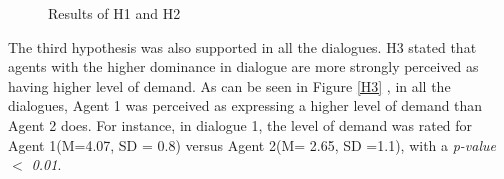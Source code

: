 \documentclass{llncs}
\begin{document}
							\begin{figure}[htb!]
					\setlength\fboxsep{0pt}\setlength\fboxrule{0.75pt}
					{
						\caption{Results of H1 and H2}
						
					}
				\end{figure}%
				
				\par The third hypothesis was also supported in all the dialogues. H3 stated that agents with the higher dominance in dialogue are more strongly perceived as having higher level of demand. As can be seen in Figure \ref{H3} , in all the dialogues, Agent 1 was perceived as expressing a higher level of demand than Agent 2 does. For instance, in dialogue 1, the level of demand was rated for Agent 1(M=4.07, SD = 0.8) versus Agent 2(M= 2.65, SD =1.1), with a \textit{p-value $<$ 0.01}.
				
\end{document}
